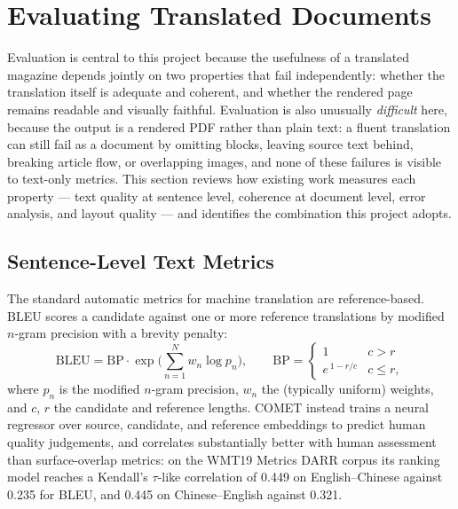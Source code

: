 \section{Evaluating Translated Documents}
\label{sec:background-eval}

Evaluation is central to this project because the usefulness of a
translated magazine depends jointly on two properties that fail
independently: whether the translation itself is adequate and coherent,
and whether the rendered page remains readable and visually faithful.
Evaluation is also unusually \emph{difficult} here, because the output
is a rendered PDF rather than plain text: a fluent translation can
still fail as a document by omitting blocks, leaving source text
behind, breaking article flow, or overlapping images, and none of these
failures is visible to text-only metrics. This section reviews how
existing work measures each property --- text quality at sentence
level, coherence at document level, error analysis, and layout quality
--- and identifies the combination this project adopts.

\subsection{Sentence-Level Text Metrics}

The standard automatic metrics for machine translation are
reference-based. BLEU \cite{papineni2002bleu} scores a candidate
against one or more reference translations by modified $n$-gram
precision with a brevity penalty:
\begin{equation}
\mathrm{BLEU} = \mathrm{BP} \cdot \exp\!\Big(\sum_{n=1}^{N} w_n \log p_n\Big),
\qquad
\mathrm{BP} =
\begin{cases}
1 & c > r\\
e^{\,1-r/c} & c \le r,
\end{cases}
\label{eq:bleu}
\end{equation}
where $p_n$ is the modified $n$-gram precision, $w_n$ the (typically
uniform) weights, and $c$, $r$ the candidate and reference lengths.
COMET \cite{rei2020comet} instead trains a neural regressor over
source, candidate, and reference embeddings to predict human quality
judgements, and correlates substantially better with human assessment
than surface-overlap metrics: on the WMT19 Metrics DARR corpus its
ranking model reaches a Kendall's $\tau$-like correlation of 0.449 on
English--Chinese against 0.235 for BLEU, and 0.445 on Chinese--English
against 0.321.

